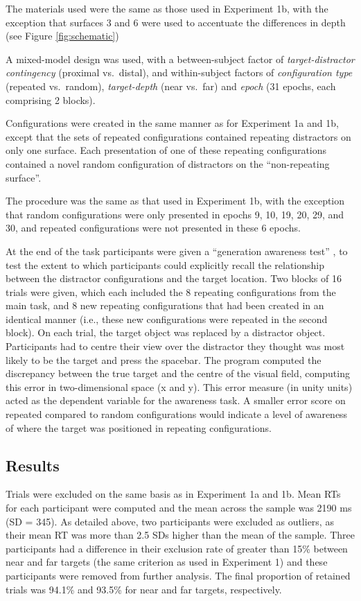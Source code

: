 \documentclass[
  man,floatsintext]{apa7}
\begin{document}
The materials used were the same as those used in Experiment 1b, with the exception that surfaces 3 and 6 were used to accentuate the differences in depth (see Figure \ref{fig:schematic})

A mixed-model design was used, with a between-subject factor of \emph{target-distractor contingency} (proximal vs.~distal), and within-subject factors of \emph{configuration type} (repeated vs.~random), \emph{target-depth} (near vs.~far) and \emph{epoch} (31 epochs, each comprising 2 blocks).

Configurations were created in the same manner as for Experiment 1a and 1b, except that the sets of repeated configurations contained repeating distractors on only one surface. Each presentation of one of these repeating configurations contained a novel random configuration of distractors on the ``non-repeating surface''.

The procedure was the same as that used in Experiment 1b, with the exception that random configurations were only presented in epochs 9, 10, 19, 20, 29, and 30, and repeated configurations were not presented in these 6 epochs.

At the end of the task participants were given a ``generation awareness test'' , to test the extent to which participants could explicitly recall the relationship between the distractor configurations and the target location. Two blocks of 16 trials were given, which each included the 8 repeating configurations from the main task, and 8 new repeating configurations that had been created in an identical manner (i.e., these new configurations were repeated in the second block). On each trial, the target object was replaced by a distractor object. Participants had to centre their view over the distractor they thought was most likely to be the target and press the spacebar. The program computed the discrepancy between the true target and the centre of the visual field, computing this error in two-dimensional space (x and y). This error measure (in unity units) acted as the dependent variable for the awareness task. A smaller error score on repeated compared to random configurations would indicate a level of awareness of where the target was positioned in repeating configurations.

\hypertarget{results-1}{%
\subsection{Results}\label{results-1}}

Trials were excluded on the same basis as in Experiment 1a and 1b. Mean RTs for each participant were computed and the mean across the sample was 2190 ms (SD = 345). As detailed above, two participants were excluded as outliers, as their mean RT was more than 2.5 SDs higher than the mean of the sample. Three participants had a difference in their exclusion rate of greater than 15\% between near and far targets (the same criterion as used in Experiment 1) and these participants were removed from further analysis. The final proportion of retained trials was 94.1\% and 93.5\% for near and far targets, respectively.
\end{document}
